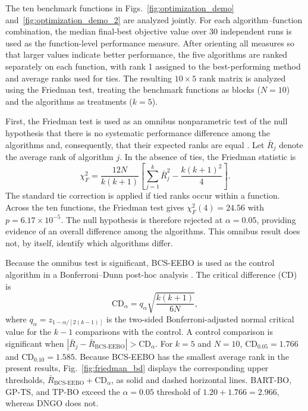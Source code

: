 \documentclass[lettersize,journal]{IEEEtran}
\begin{document}
The ten benchmark functions in Figs.~\ref{fig:optimization_demo} and~\ref{fig:optimization_demo_2} are analyzed jointly. For each algorithm--function combination, the median final-best objective value over 30 independent runs is used as the function-level performance measure. After orienting all measures so that larger values indicate better performance, the five algorithms are ranked separately on each function, with rank 1 assigned to the best-performing method and average ranks used for ties. The resulting $10\times5$ rank matrix is analyzed using the Friedman test, treating the benchmark functions as blocks ($N=10$) and the algorithms as treatments ($k=5$).

First, the Friedman test is used as an omnibus nonparametric test of the null hypothesis that there is no systematic performance difference among the algorithms and, consequently, that their expected ranks are equal \cite{Friedman1937,Demsar2006}. Let $\bar{R}_j$ denote the average rank of algorithm $j$. In the absence of ties, the Friedman statistic is
\begin{equation}
\chi_F^2=\frac{12N}{k(k+1)}
\left[\sum_{j=1}^{k}\bar{R}_j^2-\frac{k(k+1)^2}{4}\right].
\label{eq:friedman_test}
\end{equation}
The standard tie correction is applied if tied ranks occur within a function. Across the ten functions, the Friedman test gives $\chi_F^2(4)=24.56$ with $p=6.17\times10^{-5}$. The null hypothesis is therefore rejected at $\alpha=0.05$, providing evidence of an overall difference among the algorithms. This omnibus result does not, by itself, identify which algorithms differ.

Because the omnibus test is significant, BCS-EEBO is used as the control algorithm in a Bonferroni--Dunn post-hoc analysis \cite{Dunn1961,Demsar2006}. The critical difference (CD) is
\begin{equation}
\mathrm{CD}_{\alpha}=q_{\alpha}
\sqrt{\frac{k(k+1)}{6N}},
\label{eq:bonferroni_dunn_cd}
\end{equation}
where $q_{\alpha}=z_{1-\alpha/[2(k-1)]}$ is the two-sided Bonferroni-adjusted normal critical value for the $k-1$ comparisons with the control. A control comparison is significant when $|\bar{R}_j-\bar{R}_{\mathrm{BCS\text{-}EEBO}}|>\mathrm{CD}_{\alpha}$. For $k=5$ and $N=10$, $\mathrm{CD}_{0.05}=1.766$ and $\mathrm{CD}_{0.10}=1.585$. Because BCS-EEBO has the smallest average rank in the present results, Fig.~\ref{fig:friedman_bd} displays the corresponding upper thresholds, $\bar{R}_{\mathrm{BCS\text{-}EEBO}}+\mathrm{CD}_{\alpha}$, as solid and dashed horizontal lines. BART-BO, GP-TS, and TP-BO exceed the $\alpha=0.05$ threshold of $1.20+1.766=2.966$, whereas DNGO does not.
\end{document}
